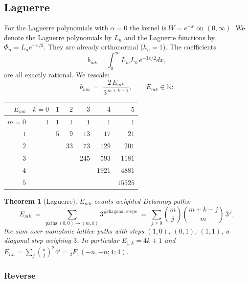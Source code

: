\documentclass[11pt,a4paper]{article}
\newtheorem{theorem}{Theorem}[section]
\theoremstyle{definition}
\newcommand{\N}{\mathbb{N}}
\begin{document}
\subsection{Laguerre}

For the Laguerre polynomials with $\alpha = 0$ the kernel is
$W = e^{-x}$ on $(0,\infty)$. We denote the Laguerre polynomials by
$L_n$ and the Laguerre functions by
$\Phi_n = L_n e^{-x/2}$. They are already orthonormal ($h_n = 1$). The coefficients
\[
  b_{mk} = \int_0^\infty L_m L_k\, e^{-3x/2} dx ,
\]
are all exactly rational. We rescale:
\[
  b_{mk} \;=\; \frac{2\, E_{mk}}{3^{\,m+k+1}}, \qquad E_{mk} \in \N :
\]

\begin{tcolorbox}[colback=black!5, colframe=black!5, boxrule=0pt, sharp corners]
\begin{center}
\begin{tabular}{r|rrrrrr}
$E_{mk}$ & $k=0$ & $1$ & $2$ & $3$ & $4$ & $5$ \\
\hline
$m=0$ & $1$ & $1$ & $1$ & $1$ & $1$ & $1$ \\
$1$ &  & $5$ & $9$ & $13$ & $17$ & $21$ \\
$2$ &  &  & $33$ & $73$ & $129$ & $201$ \\
$3$ &  &  &  & $245$ & $593$ & $1181$ \\
$4$ &  &  &  &  & $1921$ & $4881$ \\
$5$ &  &  &  &  &  & $15525$ \\
\end{tabular}
\end{center}
\end{tcolorbox}

\begin{tcolorbox}[colback=black!5, colframe=black!5, boxrule=0pt, sharp corners]
\begin{theorem}[Laguerre]\label{thm:laguerre}
$E_{mk}$ counts weighted Delannoy paths:
\[
  E_{mk} \;=\; \sum_{\text{paths } (0,0) \to (m,k)} 3^{\#\text{diagonal steps}}
  \;=\; \sum_{j \ge 0} \binom{m}{j} \binom{m+k-j}{m}\, 3^{\,j},
\]
the sum over monotone lattice paths with steps $(1,0)$, $(0,1)$,
$(1,1)$, a diagonal step weighing $3$. In particular
$E_{1,k} = 4k+1$ and
$E_{nn} = \sum_j \binom{n}{j}^2 4^j = {}_2F_1(-n,-n;1;4)$.
\end{theorem}
\end{tcolorbox}

\subsubsection*{Reverse}
\end{document}
